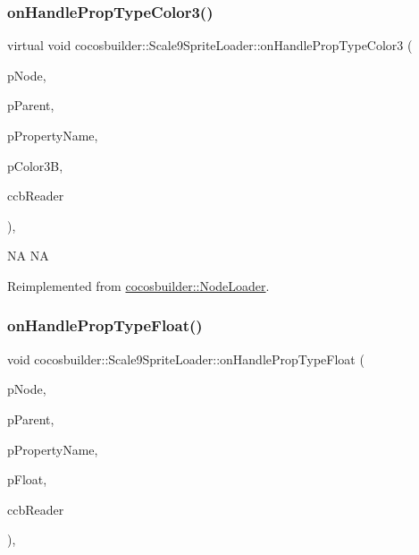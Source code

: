 \subsubsection{\texorpdfstring{on\+Handle\+Prop\+Type\+Color3()}{onHandlePropTypeColor3()}\hspace{0.1cm}{\footnotesize\ttfamily [2/2]}}
{\footnotesize\ttfamily virtual void cocosbuilder\+::\+Scale9\+Sprite\+Loader\+::on\+Handle\+Prop\+Type\+Color3 (\begin{DoxyParamCaption}\item[{cocos2d\+::\+Node $\ast$}]{p\+Node,  }\item[{cocos2d\+::\+Node $\ast$}]{p\+Parent,  }\item[{const char $\ast$}]{p\+Property\+Name,  }\item[{cocos2d\+::\+Color3B}]{p\+Color3B,  }\item[{\hyperlink{classcocosbuilder_1_1CCBReader}{C\+C\+B\+Reader} $\ast$}]{ccb\+Reader }\end{DoxyParamCaption})\hspace{0.3cm}{\ttfamily [protected]}, {\ttfamily [virtual]}}

NA  NA 

Reimplemented from \hyperlink{classcocosbuilder_1_1NodeLoader}{cocosbuilder\+::\+Node\+Loader}.

\mbox{\label{classcocosbuilder_1_1Scale9SpriteLoader_ae88766c6903f55ba9c246856cb4137f9}} 
\subsubsection{\texorpdfstring{on\+Handle\+Prop\+Type\+Float()}{onHandlePropTypeFloat()}\hspace{0.1cm}{\footnotesize\ttfamily [1/2]}}
{\footnotesize\ttfamily void cocosbuilder\+::\+Scale9\+Sprite\+Loader\+::on\+Handle\+Prop\+Type\+Float (\begin{DoxyParamCaption}\item[{cocos2d\+::\+Node $\ast$}]{p\+Node,  }\item[{cocos2d\+::\+Node $\ast$}]{p\+Parent,  }\item[{const char $\ast$}]{p\+Property\+Name,  }\item[{float}]{p\+Float,  }\item[{\hyperlink{classcocosbuilder_1_1CCBReader}{C\+C\+B\+Reader} $\ast$}]{ccb\+Reader }\end{DoxyParamCaption})\hspace{0.3cm}{\ttfamily [protected]}, {\ttfamily [virtual]}}

